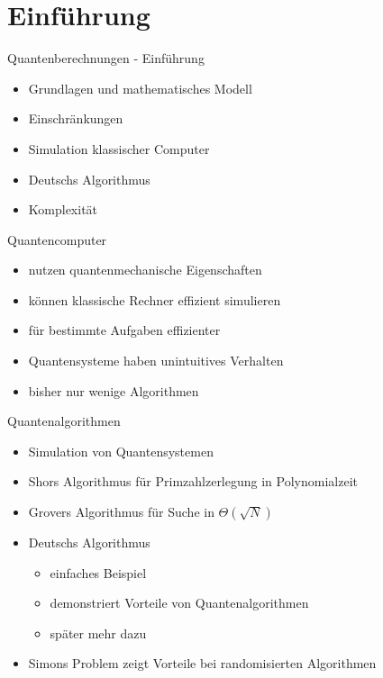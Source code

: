 \documentclass[xcolor=colortbl
,ngerman
]{beamer}
\begin{document}
\maketitle

\iffalse
\begin{frame}
    \tableofcontents
\end{frame}
\fi

\section{Einführung}


\begin{frame}{Quantenberechnungen - Einführung}
    \begin{itemize}
        \item Grundlagen und mathematisches Modell
        \item Einschränkungen
        \item Simulation klassischer Computer
        \item Deutschs Algorithmus
        \item Komplexität
    \end{itemize}
\end{frame}

\begin{frame}{Quantencomputer}
    \begin{itemize}
        \item nutzen quantenmechanische Eigenschaften
        \item können klassische Rechner effizient simulieren
        \item für bestimmte Aufgaben effizienter
        \item Quantensysteme haben unintuitives Verhalten
        \item bisher nur wenige Algorithmen
    \end{itemize}
\end{frame}

\begin{frame}{Quantenalgorithmen}
    \begin{itemize}
        \item Simulation von Quantensystemen
        \item Shors Algorithmus für Primzahlzerlegung in Polynomialzeit
        \item Grovers Algorithmus für Suche in $\Theta(\sqrt N)$
        \item Deutschs Algorithmus
            \begin{itemize}
                \item einfaches Beispiel
                \item demonstriert Vorteile von Quantenalgorithmen
                \item später mehr dazu
            \end{itemize}
        \item Simons Problem zeigt Vorteile bei randomisierten Algorithmen
    \end{itemize}
\end{frame}
\end{document}
